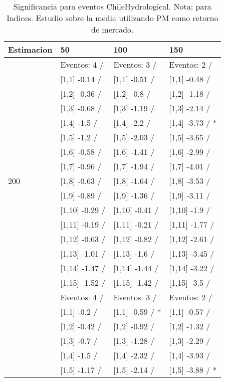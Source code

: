 \begin{table}

\caption{Significancia para eventos ChileHydrological. Nota: para Indices. Estudio sobre la media utilizando PM como retorno de mercado.}
\centering
\begin{tabular}[t]{llll}
\toprule
Estimacion & 50 & 100 & 150\\
\midrule
 & Eventos:  4 / & Eventos:  3 / & Eventos:  2 /\\
 & {}[1,1] -0.14  / & {}[1,1] -0.51  / & {}[1,1] -0.48  /\\
 & {}[1,2] -0.36  / & {}[1,2] -0.8  / & {}[1,2] -1.18  /\\
 & {}[1,3] -0.68  / & {}[1,3] -1.19  / & {}[1,3] -2.14  /\\
 & {}[1,4] -1.5  / & {}[1,4] -2.2  / & {}[1,4] -3.73  / *\\
\addlinespace
 & {}[1,5] -1.2  / & {}[1,5] -2.03  / & {}[1,5] -3.65  /\\
 & {}[1,6] -0.58  / & {}[1,6] -1.41  / & {}[1,6] -2.99  /\\
 & {}[1,7] -0.96  / & {}[1,7] -1.94  / & {}[1,7] -4.01  /\\
200 & {}[1,8] -0.63  / & {}[1,8] -1.64  / & {}[1,8] -3.53  /\\
 & {}[1,9] -0.89  / & {}[1,9] -1.36  / & {}[1,9] -3.11  /\\
\addlinespace
 & {}[1,10] -0.29  / & {}[1,10] -0.41  / & {}[1,10] -1.9  /\\
 & {}[1,11] -0.19  / & {}[1,11] -0.21  / & {}[1,11] -1.77  /\\
 & {}[1,12] -0.63  / & {}[1,12] -0.82  / & {}[1,12] -2.61  /\\
 & {}[1,13] -1.01  / & {}[1,13] -1.6  / & {}[1,13] -3.45  /\\
 & {}[1,14] -1.47  / & {}[1,14] -1.44  / & {}[1,14] -3.22  /\\
\addlinespace
 & {}[1,15] -1.52  / & {}[1,15] -1.42  / & {}[1,15] -3.5  /\\
 & Eventos:  4 / & Eventos:  3 / & Eventos:  2 /\\
 & {}[1,1] -0.2  / & {}[1,1] -0.59  / * & {}[1,1] -0.57  /\\
 & {}[1,2] -0.42  / & {}[1,2] -0.92  / & {}[1,2] -1.32  /\\
 & {}[1,3] -0.7  / & {}[1,3] -1.28  / & {}[1,3] -2.29  /\\
\addlinespace
 & {}[1,4] -1.5  / & {}[1,4] -2.32  / & {}[1,4] -3.93  /\\
 & {}[1,5] -1.17  / & {}[1,5] -2.14  / & {}[1,5] -3.88  / *\\

\end{tabular}
\end{table}

